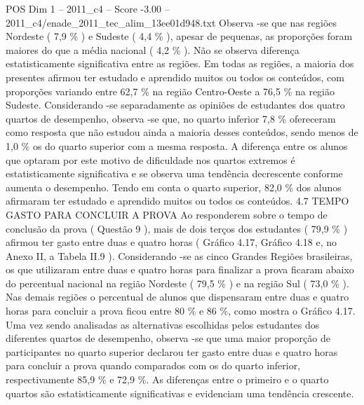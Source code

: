 \begin{textsample}{POS Dim 1 – 2011\_c4 – Score -3.00 – 2011\_c4/enade\_2011\_tec\_alim\_13ee01d948.txt}
Observa -se que nas regiões Nordeste ( 7,9 \% ) e Sudeste ( 4,4 \% ), apesar de pequenas, as proporções foram maiores do que a média nacional ( 4,2 \% ).
Não se observa diferença estatisticamente significativa entre as regiões.
Em todas as regiões, a maioria dos presentes afirmou ter estudado e aprendido muitos ou todos os conteúdos, com proporções variando entre 62,7 \% na região Centro-Oeste a 76,5 \% na região Sudeste.
Considerando -se separadamente as opiniões de estudantes dos quatro quartos de desempenho, observa -se que, no quarto inferior 7,8 \% ofereceram como resposta que não estudou ainda a maioria desses conteúdos, sendo menos de 1,0 \% os do quarto superior com a mesma resposta.
A diferença entre os alunos que optaram por este motivo de dificuldade nos quartos extremos é estatisticamente significativa e se observa uma tendência decrescente conforme aumenta o desempenho.
Tendo em conta o quarto superior, 82,0 \% dos alunos afirmaram ter estudado e aprendido muitos ou todos os conteúdos. 4.7 TEMPO GASTO PARA CONCLUIR A PROVA Ao responderem sobre o tempo de conclusão da prova ( Questão 9 ), mais de dois terços dos estudantes ( 79,9 \% ) afirmou ter gasto entre duas e quatro horas ( Gráfico 4.17, Gráfico 4.18 e, no Anexo II, a Tabela II.9 ).
Considerando -se as cinco Grandes Regiões brasileiras, os que utilizaram entre duas e quatro horas para finalizar a prova ficaram abaixo do percentual nacional na região Nordeste ( 79,5 \% ) e na região Sul ( 73,0 \% ).
Nas demais regiões o percentual de alunos que dispensaram entre duas e quatro horas para concluir a prova ficou entre 80 \% e 86 \%, como mostra o Gráfico 4.17.
Uma vez sendo analisadas as alternativas escolhidas pelos estudantes dos diferentes quartos de desempenho, observa -se que uma maior proporção de participantes no quarto superior declarou ter gasto entre duas e quatro horas para concluir a prova quando comparados com os do quarto inferior, respectivamente 85,9 \% e 72,9 \%.
As diferenças entre o primeiro e o quarto quartos são estatisticamente significativas e evidenciam uma tendência crescente.

\end{textsample}
